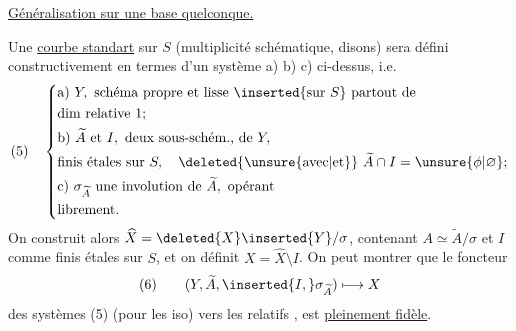 \uline{Généralisation sur une base quelconque.}

Une \uline{courbe standart} sur $S$ (multiplicité schématique, disons) sera défini constructivement en termes d'un système a) b) c)  ci-dessus, i.e.
\[
(5)\quad\left\{\begin{aligned}
&\text{a) }Y,\text{ schéma propre et lisse }\inserted{\text{sur }S}\text{ partout de}\\
&\text{dim relative }1;\\
&\text{b) }\widetilde A\text{ et }I,\text{ deux sous-schém., de }Y,\\
&\text{finis étales sur }S,\quad\deleted{\unsure{\text{avec}|\text{et}}}\ \widetilde A\cap I=\unsure{\phi|\varnothing};\\
&\text{c) }\sigma_{\widetilde A}\text{ une involution de }\widetilde A,\text{ opérant}\\
&\text{librement.}
\end{aligned}\right.
\]
On construit alors $\widehat X=\deleted{X}\inserted{Y}/\sigma$, contenant $A\simeq\widetilde A/\sigma$ et $I$ comme   finis étales sur $S$, et on définit $X=\widehat X\setminus I$. On peut montrer que le foncteur
\[
(6)\qquad(Y,\widetilde A,\inserted{I,}\sigma_{\widetilde A})\longmapsto X
\]
des systèmes (5) (pour les iso) vers les  relatifs , est \uline{pleinement fidèle}.
